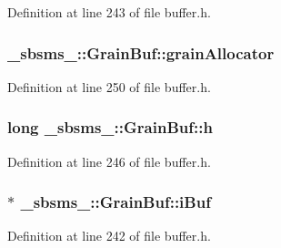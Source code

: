 Definition at line 243 of file buffer.\+h.

\subsubsection[{\texorpdfstring{grain\+Allocator}{grainAllocator}}]{ \+\_\+sbsms\+\_\+\+::\+Grain\+Buf\+::grain\+Allocator\hspace{0.3cm}{\ttfamily [protected]}}\hypertarget{class__sbsms___1_1_grain_buf_aef014423146ce4eb1b3d55d767fc16aa}{}\label{class__sbsms___1_1_grain_buf_aef014423146ce4eb1b3d55d767fc16aa}


Definition at line 250 of file buffer.\+h.

\subsubsection[{\texorpdfstring{h}{h}}]{\setlength{\rightskip}{0pt plus 5cm}long \+\_\+sbsms\+\_\+\+::\+Grain\+Buf\+::h\hspace{0.3cm}{\ttfamily [protected]}}\hypertarget{class__sbsms___1_1_grain_buf_ad39a40f0146c178ef21a0ce5028d0641}{}\label{class__sbsms___1_1_grain_buf_ad39a40f0146c178ef21a0ce5028d0641}


Definition at line 246 of file buffer.\+h.

\subsubsection[{\texorpdfstring{i\+Buf}{iBuf}}]{$\ast$ \+\_\+sbsms\+\_\+\+::\+Grain\+Buf\+::i\+Buf\hspace{0.3cm}{\ttfamily [protected]}}\hypertarget{class__sbsms___1_1_grain_buf_ad30a47a1ac64d553c4603760c77f4d80}{}\label{class__sbsms___1_1_grain_buf_ad30a47a1ac64d553c4603760c77f4d80}


Definition at line 242 of file buffer.\+h.

